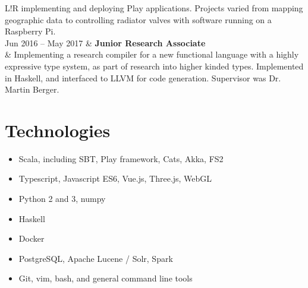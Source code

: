 \documentclass[10pt]{article}
\newcommand\VRule{\color{lightgray}\vrule width 0.5pt}
\begin{document}
\begin{tabular}{L!{\VRule}R}
                        implementing and deploying Play applications. Projects
                        varied from mapping geographic data to controlling
                        radiator valves with software running on a Raspberry
                        Pi. \\ [5pt]
    Jun 2016 -- May 2017 & \textbf{Junior Research Associate} \\
                        & Implementing a research compiler for a new functional
                        language with a highly expressive type system, as part
                        of research into higher kinded types. Implemented in
                        Haskell, and interfaced to LLVM for code generation.
                        Supervisor was Dr. Martin Berger. \\ [5pt]

\end{tabular}

\section*{Technologies}
\begin{multicols}{2}
\begin{itemize}
    \itemsep0em
    \item Scala, including SBT, Play framework, Cats, Akka, FS2
    \item Typescript, Javascript ES6, Vue.js, Three.js, WebGL
    \item Python 2 and 3, numpy
    \item Haskell
    \item Docker
    \item PostgreSQL, Apache Lucene / Solr, Spark
    \item Git, vim, bash, and general command line tools
\end{itemize}
\end{multicols}
\end{document}
